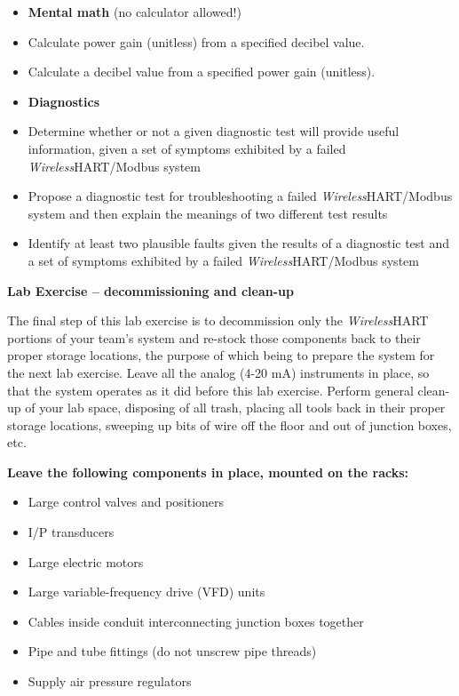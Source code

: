 \begin{itemize}
\filbreak

\begin{itemize}
\item{} {\bf Mental math} (no calculator allowed!)
\item{} Calculate power gain (unitless) from a specified decibel value.
\item{} Calculate a decibel value from a specified power gain (unitless).
\end{itemize}

\filbreak

\begin{itemize}
\item{} {\bf Diagnostics}
\item{} Determine whether or not a given diagnostic test will provide useful information, given a set of symptoms exhibited by a failed {\sl Wireless}HART/Modbus system
\item{} Propose a diagnostic test for troubleshooting a failed {\sl Wireless}HART/Modbus system and then explain the meanings of two different test results
\item{} Identify at least two plausible faults given the results of a diagnostic test and a set of symptoms exhibited by a failed {\sl Wireless}HART/Modbus system
\end{itemize}









\vfil \eject

\noindent
{\bf Lab Exercise -- decommissioning and clean-up}

\vskip 5pt

The final step of this lab exercise is to decommission only the {\sl Wireless}HART portions of your team's system and re-stock those components back to their proper storage locations, the purpose of which being to prepare the system for the next lab exercise.  Leave all the analog (4-20 mA) instruments in place, so that the system operates as it did before this lab exercise.  Perform general clean-up of your lab space, disposing of all trash, placing all tools back in their proper storage locations, sweeping up bits of wire off the floor and out of junction boxes, etc.

\vskip 10pt

\indent
{\bf Leave the following components in place, mounted on the racks:}

\begin{itemize}
\item{} Large control valves and positioners
\item{} I/P transducers
\item{} Large electric motors
\item{} Large variable-frequency drive (VFD) units
\item{} Cables inside conduit interconnecting junction boxes together
\item{} Pipe and tube fittings (do not unscrew pipe threads)
\item{} Supply air pressure regulators
\end{itemize}


\end{itemize}
